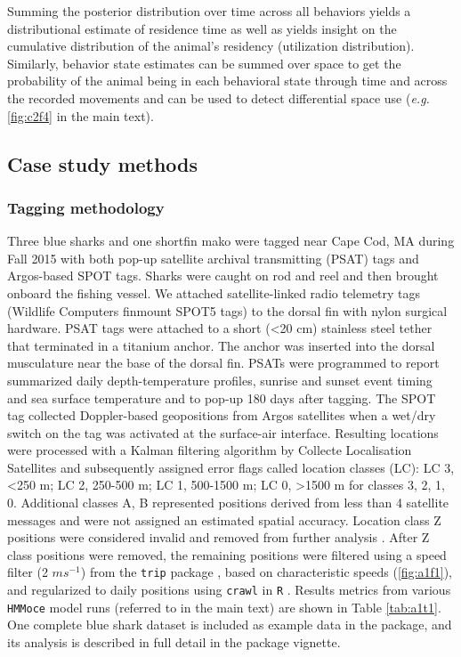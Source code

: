 Summing the posterior distribution over time across all behaviors yields a distributional estimate of residence time \citep{Pedersen2011a} as well as yields insight on the cumulative distribution of the animal's residency (utilization distribution). Similarly, behavior state estimates can be summed over space to get the probability of the animal being in each behavioral state through time and across the recorded movements and can be used to detect differential space use (\emph{e.g.} \cref{fig:c2f4} in the main text).

\subsection{Case study methods}%

\subsubsection{Tagging methodology}%

Three blue sharks and one shortfin mako were tagged near Cape Cod, MA during Fall 2015 with both pop-up satellite archival transmitting (PSAT) tags and Argos-based SPOT tags. Sharks were caught on rod and reel and then brought onboard the fishing vessel. We attached satellite-linked radio telemetry tags (Wildlife Computers finmount SPOT5 tags) to the dorsal fin with nylon surgical hardware. PSAT tags were attached to a short (\textless{}20 cm) stainless steel tether that terminated in a titanium anchor. The anchor was inserted into the dorsal musculature near the base of the dorsal fin. PSATs were programmed to report summarized daily depth-temperature profiles, sunrise and sunset event timing and sea surface temperature and to pop-up 180 days after tagging. The SPOT tag collected Doppler-based geopositions from Argos satellites when a wet/dry switch on the tag was activated at the surface-air interface. Resulting locations were processed with a Kalman filtering algorithm by Collecte Localisation Satellites \citep{Lopez2014} and subsequently assigned error flags called location classes (LC): LC 3, \textless{}250 m; LC 2, 250-500 m; LC 1, 500-1500 m; LC 0, \textgreater{}1500 m for classes 3, 2, 1, 0. Additional classes A, B represented positions derived from less than 4 satellite messages and were not assigned an estimated spatial accuracy. Location class Z positions were considered invalid and removed from further analysis \citep{CLS2008}. After Z class positions were removed, the remaining positions were filtered using a speed filter (2 $m s^{-1}$) from the \texttt{trip} package \citep{Sumner2015}, based on characteristic speeds (\cref{fig:a1f1}), and regularized to daily positions using \texttt{crawl} \citep{Johnson2008a} in \texttt{R} \citep{RDevelopmentCoreTeam2015}. Results metrics from various \texttt{HMMoce} model runs (referred to in the main text) are shown in Table \ref{tab:a1t1}. One complete blue shark dataset is included as example data in the package, and its analysis is described in full detail in the package vignette.

